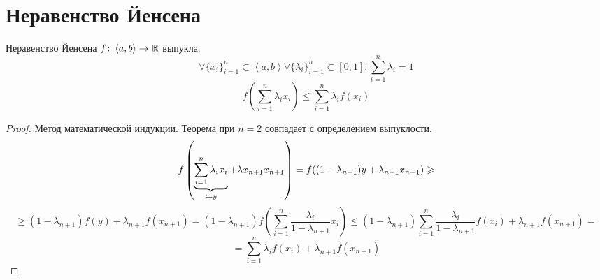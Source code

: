 ﻿\section{Неравенство Йенсена}

\begin{theorem}{Неравенство Йенсена}
$f\colon \left<a, b\right> \rightarrow \mathbb{R}$ выпукла.
$$\forall \{x_i\}_{i=1}^n \subset \left<a, b\right> \forall \{\lambda_i\}_{i=1}^n \subset [0, 1]\colon \sum_{i=1}^n \lambda_i = 1$$
$$f\left(\sum_{i=1}^n \lambda_i x_i\right) \leqslant \sum_{i=1}^n \lambda_i f(x_i)$$ 
\end{theorem}
\begin{proof}
Метод математической индукции. Теорема при $n = 2$ совпадает с определением выпуклости.
$$f\left(\underbrace{\sum_{i=1}^n \lambda_i x_i}_{\leftrightharpoons y} + \lambda x_{n+1} x_{n+1}\right) = f((1 - \lambda_{n+1})y + \lambda_{n+1} x_{n+1}) \geqslant $$
$$ \geqslant (1-\lambda_{n+1}) f(y) + \lambda_{n+1} f(x_{n+1}) = (1 - \lambda_{n+1}) f\left(\sum_{i=1}^n \frac{\lambda_i}{1 - \lambda_{n+1}} x_i\right) \leqslant (1 - \lambda_{n+1}) \sum_{i=1}^n \frac{\lambda_i}{1-\lambda_{n+1}} f(x_i) + \lambda_{n+1} f(x_{n+1}) = $$
$$= \sum_{i=1}^n \lambda_i f(x_i) + \lambda_{n+1} f(x_{n+1})$$
\end{proof}
